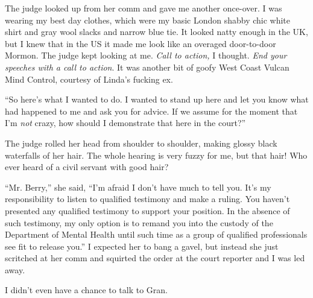 The judge looked up from her comm and gave me another once-over. I
was wearing my best day clothes, which were my basic London shabby
chic white shirt and gray wool slacks and narrow blue tie. It
looked natty enough in the UK, but I knew that in the US it made me
look like an overaged door-to-door Mormon. The judge kept looking
at me. \emph{Call to action,} I thought.
\emph{End your speeches with a call to action}. It was another bit
of goofy West Coast Vulcan Mind Control, courtesy of Linda’s
fucking ex.

“So here’s what I wanted to do. I wanted to stand up here and let
you know what had happened to me and ask you for advice. If we
assume for the moment that I’m \emph{not} crazy, how should I
demonstrate that here in the court?”

The judge rolled her head from shoulder to shoulder, making glossy
black waterfalls of her hair. The whole hearing is very fuzzy for
me, but that hair! Who ever heard of a civil servant with good
hair?

“Mr. Berry,” she said, “I’m afraid I don’t have much to tell you.
It’s my responsibility to listen to qualified testimony and make a
ruling. You haven’t presented any qualified testimony to support
your position. In the absence of such testimony, my only option is
to remand you into the custody of the Department of Mental Health
until such time as a group of qualified professionals see fit to
release you.” I expected her to bang a gavel, but instead she just
scritched at her comm and squirted the order at the court reporter
and I was led away.

I didn’t even have a chance to talk to Gran.

